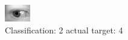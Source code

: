 \begin{figure}[h!]
\begin{center}
\includegraphics[width=0.60\columnwidth]{figures/ID726_class_2_target_4.png}
\end{center}
\caption{ Classification: 2 actual target: 4}
\label{fig:ID726_class_2_target_4}
\end{figure}
